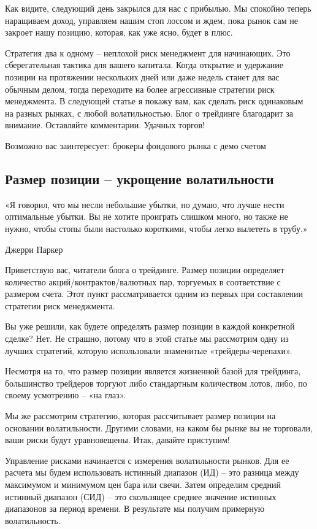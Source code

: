 \documentclass{book}
\begin{document}
Как видите, следующий день закрылся для нас с прибылью. Мы спокойно теперь наращиваем доход, управляем нашим стоп лоссом и ждем, пока рынок сам не закроет нашу позицию, которая, как уже ясно, будет в плюс.

Стратегия два к одному – неплохой риск менеджмент для начинающих. Это сберегательная тактика для вашего капитала. Когда открытие и удержание позиции на протяжении нескольких дней или даже недель станет для вас обычным делом, тогда переходите на более агрессивные стратегии риск менеджмента. В следующей статье я покажу вам, как сделать риск одинаковым на разных рынках, с любой волатильностью. Блог о трейдинге благодарит за внимание. Оставляйте комментарии. Удачных торгов!


Возможно вас заинтересует: брокеры фондового рынка с демо счетом

\subsection{Размер позиции – укрощение волатильности}

    «Я говорил, что мы несли небольшие убытки, но думаю, что лучше нести оптимальные убытки. Вы не хотите проиграть слишком много, но также не нужно, чтобы стопы были настолько короткими, чтобы легко вылететь в трубу.»

    Джерри Паркер

Приветствую вас, читатели блога о трейдинге. Размер позиции определяет количество акций/контрактов/валютных пар, торгуемых в соответствие с размером счета. Этот пункт рассматривается одним из первых при составлении стратегии риск менеджмента.

Вы уже решили, как будете определять размер позиции в каждой конкретной сделке? Нет. Не страшно, потому что в этой статье мы рассмотрим одну из лучших стратегий, которую использовали знаменитые «трейдеры-черепахи».

Несмотря на то, что размер позиции является жизненной базой для трейдинга, большинство трейдеров торгуют либо стандартным количеством лотов, либо, по своему усмотрению – «на глаз».

Мы же рассмотрим стратегию, которая рассчитывает размер позиции на основании волатильности. Другими словами, на каком бы рынке вы не торговали, ваши риски будут уравновешены. Итак, давайте приступим!

Управление рисками начинается с измерения волатильности рынков. Для ее расчета мы будем использовать истинный диапазон (ИД) – это разница между максимумом и минимумом цен бара или свечи. Затем определим средний истинный диапазон (СИД) – это скользящее среднее значение истинных диапазонов за период времени. В результате мы получим примерную волатильность.
\end{document}
